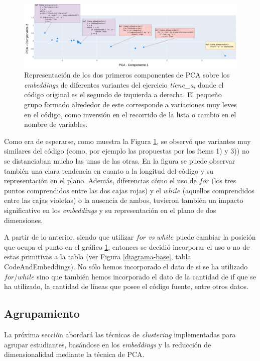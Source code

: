 \documentclass[11pt,a4paper,twoside,openany]{tesis}
\begin{document}
\begin{figure}[H]
    \centering
    \includegraphics[width=\textwidth]{imagenes/codigo-similar.png}
    \caption{Representación de los dos primeros componentes de PCA sobre los \emph{embeddings} de diferentes variantes del ejercicio \emph{tiene\_a}, donde el código original es el segundo de izquierda a derecha. El pequeño grupo formado alrededor de este corresponde a variaciones muy leves en el código, como inversión en el recorrido de la lista o cambio en el nombre de variables.}
     \label{variaciones-codigo}
\end{figure}

Como era de esperarse, como muestra la Figura \ref{variaciones-codigo}, se observó que variantes muy similares del código (como, por ejemplo las propuestas por los ítems 1) y 3)) no se distanciaban mucho las unas de las otras. En la figura se puede observar también una clara tendencia en cuanto a la longitud del código y su representación en el plano. Además, diferencias cómo el uso de $for$ (los tres puntos comprendidos entre las dos cajas rojas) y el $while$ (aquellos comprendidos entre las cajas violetas) o la ausencia de ambos, tuvieron también un impacto significativo en los \emph{embeddings} y su representación en el plano de dos dimensiones.

A partir de lo anterior, siendo que utilizar $for$ \emph{vs} $while$ puede cambiar la posición que ocupa el punto en el gráfico \ref{variaciones-codigo}, entonces se decidió incorporar el uso o no de estas primitivas a la tabla (ver Figura \ref{diagrama-base}, tabla CodeAndEmbeddings). No sólo hemos incorporado el dato de si se ha utilizado $for$/$while$ sino que también hemos incorporado el dato de la cantidad de if que se ha utilizado, la cantidad de líneas que posee el código fuente, entre otros datos.

\subsection{Agrupamiento}

La próxima sección abordará las técnicas de \emph{clustering} implementadas para agrupar estudiantes, basándose en los \emph{embeddings} y la reducción de dimensionalidad mediante la técnica de PCA.
\end{document}
